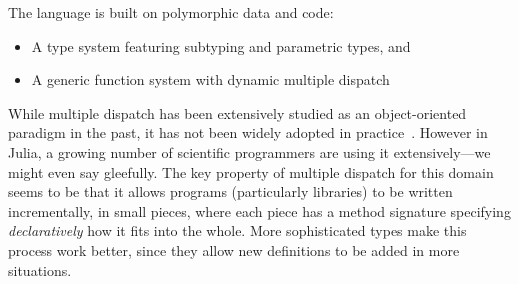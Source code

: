 \documentclass[pldi]{sigplanconf-pldi15}
\begin{document}
The language is built on polymorphic data and code:

\begin{itemize}
	\item A type system featuring subtyping and parametric types, and
	\item A generic function system with dynamic multiple dispatch
\end{itemize}
%



While multiple dispatch has been extensively studied as an object-oriented
paradigm in the past, it has not been widely adopted in practice~\cite{Muschevici:2008}.
However in Julia, a growing number of scientific programmers are using it
extensively---we might even say gleefully. The key property of multiple
dispatch for this domain seems to be that it allows programs (particularly libraries)
to be written incrementally, in small pieces, where each piece has a method signature
specifying \emph{declaratively} how it fits into the whole.
More sophisticated types make this process work better, since they allow new
definitions to be added in more situations.
\end{document}
